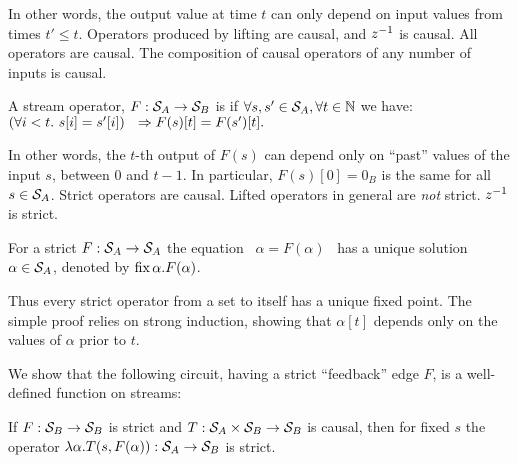 \noindent
In other words, the output value at time $t$ can only depend on 
input values from times $t' \leq t$.
Operators produced by lifting are causal, and $z^{-1}$ is causal.
All \dbsp operators are causal.  The composition
of causal operators of any number of inputs is causal.

\begin{definition}[Strictness]
A stream operator, $F:\mathcal{S}_{A}\to\mathcal{S}_{B}$ 
is 
if  $\forall s,s'\in\mathcal{S}_{A}, \forall t \in \mathbb{N}$ we have:
$(\forall i<t . ~s[i]=s'[i]) ~~\Rightarrow \\ F(s)[t]=F(s')[t].$
\end{definition}

In other words, the $t$-th output of $F(s)$ can depend only on ``past'' values
of the input $s$, between $0$ and $t-1$.  
In particular, $F(s)[0] = 0_B$ is the same for all $s \in \mathcal{S}_{A}$.
Strict operators are causal. Lifted operators in general are \emph{not} strict. 
$z^{-1}$ is strict.  %

\begin{proposition}
\label{prop-unique-fix}
For a strict $F: \mathcal{S}_{A} \to \mathcal{S}_{A}$ the equation ~$\alpha=F(\alpha)$~ has a unique
solution $\alpha \in \mathcal{S}_{A}$, denoted by $\mbox{fix}\,\alpha.F(\alpha)$. 
\end{proposition}

Thus every strict operator from a set to itself has a unique fixed point.
The simple proof relies on strong induction, showing that $\alpha[t]$ 
depends only on the values of $\alpha$ prior to $t$.  

We show that the following circuit, having a strict ``feedback'' edge $F$,
is a well-defined function on streams:
\begin{center}
\end{center}

\begin{lemma} 
\label{lemma-causal-strict}
If $F: \mathcal{S}_{B} \to \mathcal{S}_{B}$ is strict and $T: \mathcal{S}_{A} \times \mathcal{S}_{B} \to \mathcal{S}_{B}$ is causal, then for fixed $s$ the operator
$\lambda\alpha.T(s,F(\alpha)): \mathcal{S}_{A} \to \mathcal{S}_{B}$ is strict. 
\end{lemma}

